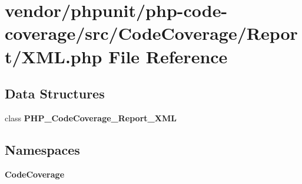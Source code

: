 \section{vendor/phpunit/php-\/code-\/coverage/src/\+Code\+Coverage/\+Report/\+X\+M\+L.php File Reference}
\label{phpunit_2php-code-coverage_2src_2_code_coverage_2_report_2_x_m_l_8php}
\subsection*{Data Structures}
\begin{DoxyCompactItemize}
\item 
class {\bf P\+H\+P\+\_\+\+Code\+Coverage\+\_\+\+Report\+\_\+\+X\+M\+L}
\end{DoxyCompactItemize}
\subsection*{Namespaces}
\begin{DoxyCompactItemize}
\item 
 {\bf Code\+Coverage}
\end{DoxyCompactItemize}
